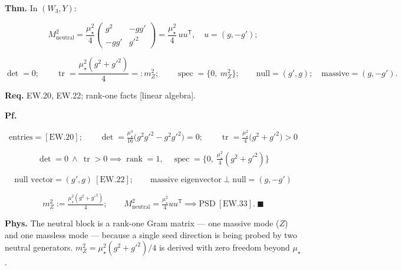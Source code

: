 \begin{theorem}\label{tag:EW-23}
\textbf{Thm.} In $(W_3,Y)$:

\[
M^2_{\mathrm{neutral}}=\frac{\mu_\star^2}{4}
\begin{pmatrix}g^2&-gg'\\ -gg'&g'^2\end{pmatrix}
=\frac{\mu_\star^2}{4}\,uu^{\mathsf T},\quad u=(g,-g');
\]

\[
\det=0;\qquad\operatorname{tr}=\frac{\mu_\star^2(g^2+g'^2)}{4}=:m_Z^2;\qquad
\operatorname{spec}=\{0,\ m_Z^2\};\qquad
\text{null}=(g',g);\quad\text{massive}=(g,-g').
\]

\textbf{Req.} EW.20, EW.22; rank-one facts [linear algebra].

\textbf{Pf.}

\[
\text{entries}=[\mathrm{EW.20}];\qquad
\det=\tfrac{\mu_\star^4}{16}\bigl(g^2g'^2-g^2g'^2\bigr)=0;\qquad
\operatorname{tr}=\tfrac{\mu_\star^2}{4}\bigl(g^2+g'^2\bigr)>0
\]

\[
\det=0\ \wedge\ \operatorname{tr}>0\implies\operatorname{rank}=1,\quad\operatorname{spec}=\bigl\{0,\ \tfrac{\mu_\star^2}{4}(g^2+g'^2)\bigr\}
\]

\[
\text{null vector}=(g',g)\ [\mathrm{EW.22}];\qquad\text{massive eigenvector}\perp\text{null}=(g,-g')
\]

\[
m_Z^2:=\tfrac{\mu_\star^2(g^2+g'^2)}{4};\qquad
M^2_{\mathrm{neutral}}=\tfrac{\mu_\star^2}{4}uu^{\mathsf T}\implies\text{PSD}\ [\mathrm{EW.33}].\ \blacksquare
\]

\textbf{Phys.} The neutral block is a rank-one Gram matrix — one massive mode ($Z$) and one massless mode — because a single seed direction is being probed by two neutral generators. $m_Z^2=\mu_\star^2(g^2+g'^2)/4$ is derived with zero freedom beyond $\mu_\star$.

\end{theorem}

